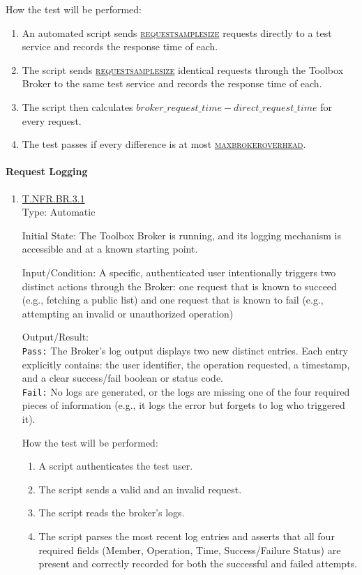 \documentclass[12pt, titlepage]{article}
\newcommand{\testdef}[1]{\leavevmode\hypertarget{test:#1}{}\hyperlink{trace:#1}{#1}}
\DeclareRobustCommand{\cname}[1]{{\renewcommand{\_}{\textunderscore\allowbreak}\textsc{#1}}}
\newcommand{\const}[1]{\hyperlink{const:\detokenize{#1}}{\cname{#1}}}
\begin{document}
\begin{enumerate}
  How the test will be performed:
  \begin{enumerate}
    \item An automated script sends \const{request\_sample\_size} requests directly to a test service and records the response time of each.
    \item The script sends \const{request\_sample\_size} identical requests through the Toolbox Broker to the same test service and records the response time of each.
    \item The script then calculates $broker\_request\_time - direct\_request\_time$ for every request.
    \item The test passes if every difference is at most \const{max\_broker\_overhead}.
  \end{enumerate}
\end{enumerate}
\paragraph{Request Logging}
\begin{enumerate}
  \item \testdef{T.NFR.BR.3.1}\\
  Type: Automatic

  Initial State: The Toolbox Broker is running, and its logging mechanism is accessible and at a known starting point.
  
  Input/Condition: A specific, authenticated user intentionally triggers two distinct actions through the Broker: one request that is known to succeed (e.g., fetching a public list) and one request that is known to fail (e.g., attempting an invalid or unauthorized operation)

  Output/Result: \\
  \texttt{Pass:} The Broker's log output displays two new distinct entries. Each entry explicitly contains: the user identifier, the operation requested, a timestamp, and a clear success/fail boolean or status code.\\
  \texttt{Fail:} No logs are generated, or the logs are missing one of the four required pieces of information (e.g., it logs the error but forgets to log who triggered it).

  How the test will be performed:
  \begin{enumerate}
    \item A script authenticates the test user.
    \item The script sends a valid and an invalid request.
    \item The script reads the broker's logs.
    \item The script parses the most recent log entries and asserts that all four required fields (Member, Operation, Time, Success/Failure Status) are present and correctly recorded for both the successful and failed attempts.
  \end{enumerate}
\end{enumerate}
\end{document}
